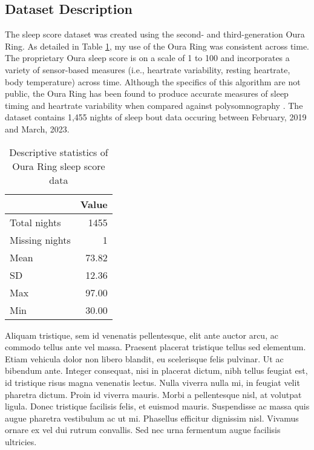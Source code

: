 \documentclass{article}
\begin{document}
\hypertarget{dataset-description}{%
\subsection{Dataset Description}\label{dataset-description}}

The sleep score dataset was created using the second- and third-generation Oura
Ring. As detailed in Table \ref{Sleep}, my use of the Oura Ring was consistent across
time. The proprietary Oura sleep score is on a scale of 1 to 100 and
incorporates a variety of sensor-based measures (i.e., heartrate variability,
resting heartrate, body temperature) across time. Although the specifics of this
algorithm are not public, the Oura Ring has been found to produce
accurate measures of sleep timing and heartrate variability when compared
against polysomnography \citep{dezambottiSleep2019}. The dataset contains 1,455
nights of sleep bout data occuring between February, 2019 and March, 2023.

\begin{table}[ht]
  \centering
  \begin{tabular}{lr}
  \toprule
     & \textbf{Value}\\ \midrule
      Total nights & 1455 \\
      Missing nights & 1 \\
      Mean & 73.82 \\
      SD & 12.36 \\
      Max & 97.00 \\
      Min & 30.00 \\
   \bottomrule
  \end{tabular}
\caption{Descriptive statistics of Oura Ring sleep score data}
\label{Sleep}
\end{table}

Aliquam tristique, sem id venenatis pellentesque, elit ante auctor arcu,
ac commodo tellus ante vel massa. Praesent placerat tristique tellus sed
elementum. Etiam vehicula dolor non libero blandit, eu scelerisque felis
pulvinar. Ut ac bibendum ante. Integer consequat, nisi in placerat
dictum, nibh tellus feugiat est, id tristique risus magna venenatis
lectus. Nulla viverra nulla mi, in feugiat velit pharetra dictum. Proin
id viverra mauris. Morbi a pellentesque nisl, at volutpat ligula. Donec
tristique facilisis felis, et euismod mauris. Suspendisse ac massa quis
augue pharetra vestibulum ac ut mi. Phasellus efficitur dignissim nisl.
Vivamus ornare ex vel dui rutrum convallis. Sed nec urna fermentum augue
facilisis ultricies.
\end{document}
